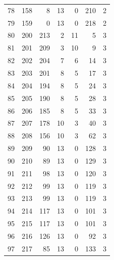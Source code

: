 \documentclass[a4paper,twoside,12pt]{book}
\begin{document}
\begin{appendices}
\begin{table}
\begin{tabular}{lrrrrrr}
		78  &    158 &         8 &        13 &               0 &             210 &         2 \\
		79  &    159 &         0 &        13 &               0 &             218 &         2 \\
		80  &    200 &       213 &         2 &              11 &               5 &         3 \\
		81  &    201 &       209 &         3 &              10 &               9 &         3 \\
		82  &    202 &       204 &         7 &               6 &              14 &         3 \\
		83  &    203 &       201 &         8 &               5 &              17 &         3 \\
		84  &    204 &       194 &         8 &               5 &              24 &         3 \\
		85  &    205 &       190 &         8 &               5 &              28 &         3 \\
		86  &    206 &       185 &         8 &               5 &              33 &         3 \\
		87  &    207 &       178 &        10 &               3 &              40 &         3 \\
		88  &    208 &       156 &        10 &               3 &              62 &         3 \\
		89  &    209 &        90 &        13 &               0 &             128 &         3 \\
		90  &    210 &        89 &        13 &               0 &             129 &         3 \\
		91  &    211 &        98 &        13 &               0 &             120 &         3 \\
		92  &    212 &        99 &        13 &               0 &             119 &         3 \\
		93  &    213 &        99 &        13 &               0 &             119 &         3 \\
		94  &    214 &       117 &        13 &               0 &             101 &         3 \\
		95  &    215 &       117 &        13 &               0 &             101 &         3 \\
		96  &    216 &       126 &        13 &               0 &              92 &         3 \\
		97  &    217 &        85 &        13 &               0 &             133 &         3 \\

\end{tabular}
\end{table}
\end{appendices}
\end{document}
